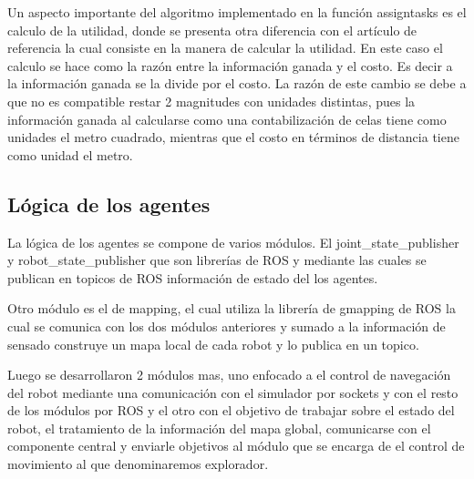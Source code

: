 \documentclass[runningheads]{llncs}
\begin{document}
Un aspecto importante del algoritmo implementado en la función assigntasks es el calculo de la utilidad, donde se presenta otra diferencia con el artículo de referencia la cual consiste en la manera de calcular la utilidad. En este caso el calculo se hace como la razón entre la información ganada y el costo. Es decir a la información ganada se la divide por el costo. La razón de este cambio se debe a que no es compatible restar 2 magnitudes con unidades distintas, pues la información ganada al calcularse como una contabilización de celas tiene como unidades el metro cuadrado, mientras que el costo en términos de distancia tiene como unidad el metro.


\subsection{Lógica de los agentes}

La lógica de los agentes se compone de varios módulos. El joint\_state\_publisher y robot\_state\_publisher que son librerías de ROS y mediante las cuales se publican en topicos de ROS información de estado del los agentes. 

Otro módulo es el de mapping, el cual utiliza la librería de gmapping de ROS la cual se comunica con los dos módulos anteriores y sumado a la información de sensado construye un mapa local de cada robot y lo publica en un topico. 

Luego se desarrollaron 2 módulos mas, uno enfocado a el control de navegación del robot mediante una comunicación con el simulador por sockets y con el resto de los módulos por ROS y el otro con el objetivo de trabajar sobre el estado del robot, el tratamiento de la información del mapa global, comunicarse con el componente central y enviarle objetivos al módulo que se encarga de el control de movimiento al que denominaremos explorador.
\end{document}

